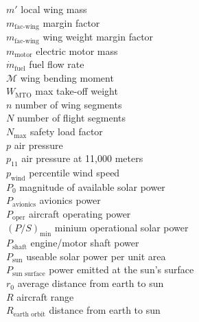 \begin{multicols}{2}
\begin{tabbing}
$m'$ \> local wing mass \\ %
$m_{\text{fac-wing}}$ \> margin factor\\
$m_{\text{fac-wing}}$ \> wing weight margin factor \\
$m_{\text{motor}}$ \> electric motor mass \\
$\dot{m}_{\text{fuel}}$ \> fuel flow rate \\ %
$\mathcal{M}$ \> wing bending moment \\ %
$W_{\text{MTO}}$\> max take-off weight \\ %
$n$ \> number of wing segments \\
$N$ \> number of flight segments \\
$N_{\text{max}}$ \> safety load factor\\
$p$ \> air pressure \\ %
$p_{11}$ \> air pressure at 11,000 meters \\ %
$p_{\text{wind}}$ \> percentile wind speed \\
$P_{0}$ \> magnitude of available solar power \\ %
$P_{\text{avionics}}$ \> avionics power \\ %
$P_{\text{oper}}$ \> aircraft operating power \\ %
$(P/S)_{\text{min}}$ \> minium operational solar power \\ %
$P_{\text{shaft}}$ \> engine/motor shaft power \\ %
$P_{\text{sun}}$ \> useable solar power per unit area \\ %
$P_{\text{sun surface}}$ \> power emitted at the sun's surface \\ %
$r_0$ \> average distance from earth to sun \\
$R$ \> aircraft range \\ %
$R_{\text{earth orbit}}$ \> distance from earth to sun \\

\end{tabbing}
\end{multicols}

